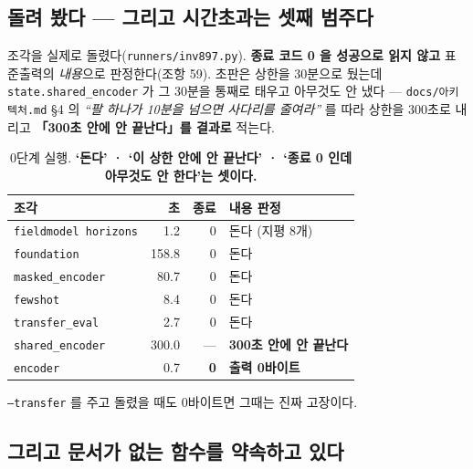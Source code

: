 \documentclass[10pt]{article}
\begin{document}
\subsection{돌려 봤다 --- 그리고 시간초과는 셋째 범주다}

조각을 실제로 돌렸다(\texttt{runners/inv897.py}). \textbf{종료 코드 0 을 성공으로
읽지 않고} 표준출력의 \emph{내용}으로 판정한다(조항 59). 초판은 상한을 30분으로
뒀는데 \texttt{state.shared\_encoder} 가 그 30분을 통째로 태우고 아무것도 안
냈다 --- \texttt{docs/아키텍처.md} §4 의 \emph{``팔 하나가 10분을 넘으면 사다리를
줄여라''} 를 따라 상한을 300초로 내리고 \textbf{「300초 안에 안 끝난다」를 결과로}
적는다.

\begin{table}[h]\centering\tsize
\begin{tabular}{lrrl}
\toprule
조각 & 초 & 종료 & 내용 판정 \\
\midrule
\texttt{fieldmodel horizons} & 1.2 & 0 & 돈다 (지평 8개) \\
\texttt{foundation} & 158.8 & 0 & 돈다 \\
\texttt{masked\_encoder} & 80.7 & 0 & 돈다 \\
\texttt{fewshot} & 8.4 & 0 & 돈다 \\
\texttt{transfer\_eval} & 2.7 & 0 & 돈다 \\
\texttt{shared\_encoder} & 300.0 & --- & \textbf{300초 안에 안 끝난다} \\
\texttt{encoder} & 0.7 & \textbf{0} & \textbf{출력 0바이트} \\
\bottomrule
\end{tabular}
\caption{0단계 실행. \textbf{`돈다' · `이 상한 안에 안 끝난다' · `종료 0 인데 아무것도
안 한다'는 셋이다.}}
\label{tab:run}
\end{table}

{\texttt{--transfer} 를 주고 돌렸을 때도 0바이트면 그때는 진짜 고장이다.}

\subsection{그리고 문서가 없는 함수를 약속하고 있다}
\end{document}
